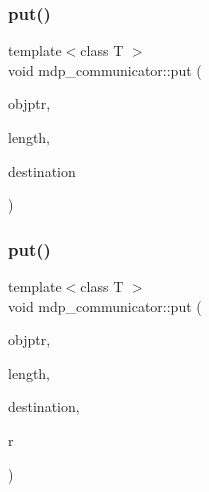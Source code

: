 \mbox{\label{classmdp__communicator_a0e51d7eed859c17e2fde64087bec4449}} 
\subsubsection{\texorpdfstring{put()}{put()}\hspace{0.1cm}{\footnotesize\ttfamily [3/4]}}
{\footnotesize\ttfamily template$<$class T $>$ \\
void mdp\+\_\+communicator\+::put (\begin{DoxyParamCaption}\item[{T $\ast$}]{objptr,  }\item[{\hyperlink{mdp__global__vars_8h_aaa1ad9d0dcd2124aa5af0120d9954174}{mdp\+\_\+int}}]{length,  }\item[{int}]{destination }\end{DoxyParamCaption})\hspace{0.3cm}{\ttfamily [inline]}}

\mbox{\label{classmdp__communicator_a6ba5504485c001d1897cd66e4575e494}} 
\subsubsection{\texorpdfstring{put()}{put()}\hspace{0.1cm}{\footnotesize\ttfamily [4/4]}}
{\footnotesize\ttfamily template$<$class T $>$ \\
void mdp\+\_\+communicator\+::put (\begin{DoxyParamCaption}\item[{T $\ast$}]{objptr,  }\item[{\hyperlink{mdp__global__vars_8h_aaa1ad9d0dcd2124aa5af0120d9954174}{mdp\+\_\+int}}]{length,  }\item[{int}]{destination,  }\item[{\hyperlink{mdp__communicator_8h_ad8cbf5bc85a849902c39cd29d3f9a8f1}{mdp\+\_\+request} \&}]{r }\end{DoxyParamCaption})\hspace{0.3cm}{\ttfamily [inline]}}

\mbox{\label{classmdp__communicator_a46086387c07ac505f7658718b52c073e}} 
